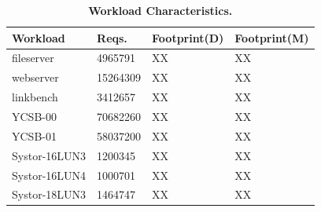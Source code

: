 \begin{table}[tb]
    \centering
    \fontsize{11}{11}
    \small
    \begin{tabular}{|l|l|l|l|}
		\hline
		\bf{Workload} & \bf{Reqs.} & \bf{Footprint(D)} & \bf{Footprint(M)} \\ \hline \hline
		fileserver & 4965791 & XX & XX \\ \hline 		
		webserver & 15264309 & XX & XX \\ \hline 		
		linkbench & 3412657 & XX & XX \\ \hline 		
		YCSB-00 & 70682260 & XX & XX \\ \hline 		
		YCSB-01 & 58037200 & XX & XX \\ \hline 		
		Systor-16LUN3 & 1200345 & XX & XX \\ \hline 		
		Systor-16LUN4 & 1000701 & XX & XX \\ \hline 		
		Systor-18LUN3 & 1464747 & XX & XX \\ \hline 		
    \end{tabular}
    \caption{\textbf{Workload Characteristics.}}
    \label{tab:wk_char}
\end{table}


